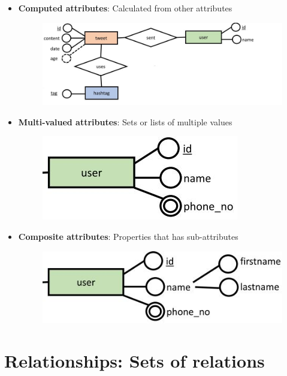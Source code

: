 \documentclass[conference]{IEEEtran}
\begin{document}
\begin{itemize}
    \item \textbf{Computed attributes}: Calculated from other attributes
    \begin{figure} [h!]
        \centering
        \includegraphics[scale=0.4]{Ex3.JPG}
    \end{figure}
    \item \textbf{Multi-valued attributes}: Sets or lists of multiple values
    \begin{figure} [h!]
        \centering
        \includegraphics[scale=0.4]{Ex4.JPG}
    \end{figure}
    \item \textbf{Composite attributes}: Properties that has sub-attributes
    \begin{figure} [h!]
        \centering
        \includegraphics[scale=0.4]{Ex5.JPG}
    \end{figure}
\end{itemize}

\pagebreak

\section{Relationships: Sets of relations}
\end{document}
